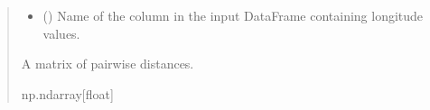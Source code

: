 \documentclass[letterpaper,10pt,english]{sphinxmanual}
\begin{document}
\begin{fulllineitems}
\begin{quote}
\begin{description}
\begin{itemize}
\item {}
\sphinxAtStartPar
{} () \textendash{} Name of the column in the input DataFrame containing longitude values.

\end{itemize}

\sphinxAtStartPar
{} \textendash{} A matrix of pairwise distances.

\sphinxAtStartPar
np.ndarray{[}float{]}

\end{description}\end{quote}

\end{fulllineitems}

\end{document}
